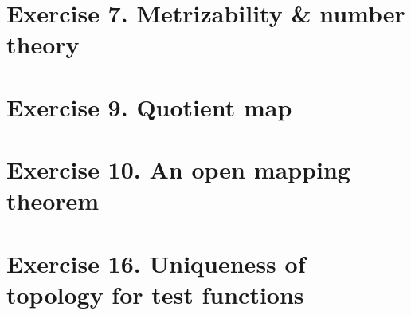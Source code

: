%
%
\newpage
\section{Exercise 7. Metrizability \& number theory}

\newpage
\section{Exercise 9. Quotient map}

\newpage
\section{Exercise 10. An open mapping theorem}

%
\newpage
\section{Exercise 16. Uniqueness of topology for test functions}

%